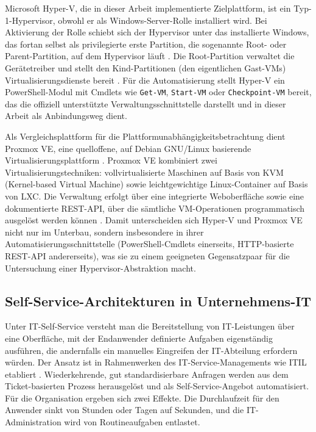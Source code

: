 \documentclass[12pt,a4paper]{article}
\begin{document}
Microsoft Hyper-V, die in dieser Arbeit implementierte Zielplattform, ist ein Typ-1-Hypervisor, obwohl er als Windows-Server-Rolle installiert wird. Bei Aktivierung der Rolle schiebt sich der Hypervisor unter das installierte Windows, das fortan selbst als privilegierte erste Partition, die sogenannte Root- oder Parent-Partition, auf dem Hypervisor läuft \parencite{microsoft-hyperv-architecture}. Die Root-Partition verwaltet die Gerätetreiber und stellt den Kind-Partitionen (den eigentlichen Gast-VMs) Virtualisierungsdienste bereit \parencite{microsoft-hyperv-overview}. Für die Automatisierung stellt Hyper-V ein PowerShell-Modul mit Cmdlets wie \texttt{Get-VM}, \texttt{Start-VM} oder \texttt{Checkpoint-VM} bereit, das die offiziell unterstützte Verwaltungsschnittstelle darstellt und in dieser Arbeit als Anbindungsweg dient.

Als Vergleichsplattform für die Plattformunabhängigkeitsbetrachtung dient Proxmox VE, eine quelloffene, auf Debian GNU/Linux basierende Virtualisierungsplattform \parencite{proxmox-ve-admin-guide}. Proxmox VE kombiniert zwei Virtualisierungstechniken: vollvirtualisierte Maschinen auf Basis von KVM (Kernel-based Virtual Machine) sowie leichtgewichtige Linux-Container auf Basis von LXC. Die Verwaltung erfolgt über eine integrierte Weboberfläche sowie eine dokumentierte REST-API, über die sämtliche VM-Operationen programmatisch ausgelöst werden können \parencite{proxmox-ve-api}. Damit unterscheiden sich Hyper-V und Proxmox VE nicht nur im Unterbau, sondern insbesondere in ihrer Automatisierungsschnittstelle (PowerShell-Cmdlets einerseits, HTTP-basierte REST-API andererseits), was sie zu einem geeigneten Gegensatzpaar für die Untersuchung einer Hypervisor-Abstraktion macht.

\subsection{Self-Service-Architekturen in Unternehmens-IT}

Unter IT-Self-Service versteht man die Bereitstellung von IT-Leistungen über eine Oberfläche, mit der Endanwender definierte Aufgaben eigenständig ausführen, die andernfalls ein manuelles Eingreifen der IT-Abteilung erfordern würden. Der Ansatz ist in Rahmenwerken des IT-Service-Managements wie ITIL etabliert \parencite{itil4-2019}. Wiederkehrende, gut standardisierbare Anfragen werden aus dem Ticket-basierten Prozess herausgelöst und als Self-Service-Angebot automatisiert. Für die Organisation ergeben sich zwei Effekte. Die Durchlaufzeit für den Anwender sinkt von Stunden oder Tagen auf Sekunden, und die IT-Administration wird von Routineaufgaben entlastet.
\end{document}
